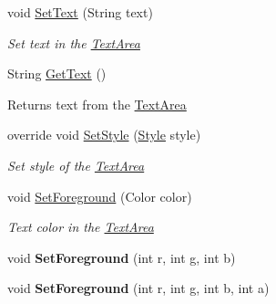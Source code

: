 \begin{DoxyCompactItemize}
void \mbox{\hyperlink{class_space_v_i_l_1_1_text_area_a5c1fcd7e4bcf6c9a508d997f59b27bcb}{Set\+Text}} (String text)
\begin{DoxyCompactList}\small\item\em Set text in the \mbox{\hyperlink{class_space_v_i_l_1_1_text_area}{Text\+Area}} \end{DoxyCompactList}\item 
\mbox{\label{class_space_v_i_l_1_1_text_area_ac05ac1c354666ec6c88643c430072587}} 
String \mbox{\hyperlink{class_space_v_i_l_1_1_text_area_ac05ac1c354666ec6c88643c430072587}{Get\+Text}} ()
\begin{DoxyCompactList}\small\item\em \begin{DoxyReturn}{Returns}
text from the \mbox{\hyperlink{class_space_v_i_l_1_1_text_area}{Text\+Area}} 
\end{DoxyReturn}
\end{DoxyCompactList}\item 
override void \mbox{\hyperlink{class_space_v_i_l_1_1_text_area_a348d8c59439854876e894867fea7c7c1}{Set\+Style}} (\mbox{\hyperlink{class_space_v_i_l_1_1_decorations_1_1_style}{Style}} style)
\begin{DoxyCompactList}\small\item\em Set style of the \mbox{\hyperlink{class_space_v_i_l_1_1_text_area}{Text\+Area}} \end{DoxyCompactList}\item 
void \mbox{\hyperlink{class_space_v_i_l_1_1_text_area_aa9c6056e93687169789b8631759dd7f2}{Set\+Foreground}} (Color color)
\begin{DoxyCompactList}\small\item\em Text color in the \mbox{\hyperlink{class_space_v_i_l_1_1_text_area}{Text\+Area}} \end{DoxyCompactList}\item 
\mbox{\label{class_space_v_i_l_1_1_text_area_ace35298bf7fb9cde027c38750368fcfb}} 
void {\bfseries Set\+Foreground} (int r, int g, int b)
\item 
\mbox{\label{class_space_v_i_l_1_1_text_area_a0a8bbdfbcc7553cbfb7ca51e5b7d2878}} 
void {\bfseries Set\+Foreground} (int r, int g, int b, int a)
\item 
\mbox{\label{class_space_v_i_l_1_1_text_area_a94e6ee39955acd614f353c6c8df3b7d1}} 

\end{DoxyCompactItemize}
